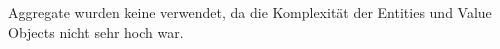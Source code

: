 

Aggregate wurden keine verwendet, da die Komplexität der Entities und Value Objects nicht sehr hoch war.

